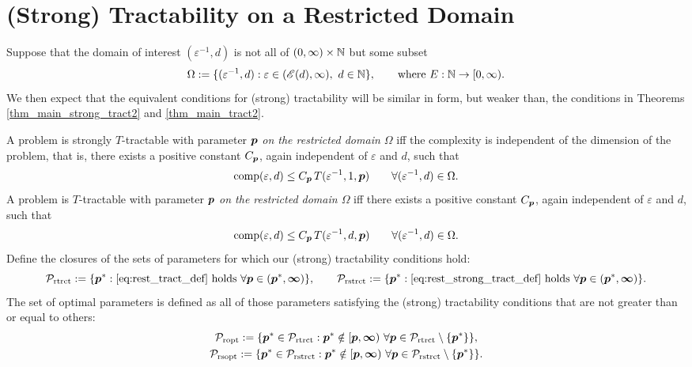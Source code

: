 \documentclass[sort&compress]{elsarticle}
\newcommand{\theM}{\mathscr{E}}
\newcommand{\peter}[1]{\begingroup\color{purple}#1\endgroup}
\begin{document}
\section{(Strong) Tractability on a Restricted Domain}

Suppose that the domain of interest $(\varepsilon^{-1},d)$ is not all of $(0,\infty) \times \mathbb{N}$ but some subset
\begin{equation}
    \Omega  := \{(\varepsilon^{-1},d) : \varepsilon \in (\theM(d),\infty), \ d \in \naturals \}, \qquad \text{where }E : \naturals \to [0,\infty).
\end{equation}
We then expect that the equivalent conditions for (strong) tractability will be similar in form, but weaker than, the conditions in Theorems  \ref{thm_main_strong_tract2} and \ref{thm_main_tract2}.

\begin{definition}
    A problem is strongly
$T$-tractable with parameter $\boldsymbol{p}$ \emph{on the restricted domain $\Omega$} iff the complexity is independent of the dimension of the problem, that is, there exists a positive constant $C_{\boldsymbol{p}}$, again independent of $\varepsilon$ and $d$, such that
\begin{equation} \label{eq:rest_strong_tract_def}
	\operatorname{comp}(\varepsilon,d) \le C_{\boldsymbol{p}}\, T(\varepsilon^{-1},1,\boldsymbol{p}) \qquad \forall(\varepsilon^{-1},d) \in \Omega.
\end{equation}
A problem is 
$T$-tractable with parameter $\boldsymbol{p}$ \emph{on the restricted domain $\Omega$} iff there exists a positive constant $C_{\boldsymbol{p}}$, again independent of $\varepsilon$ and $d$, such that
\begin{equation} \label{eq:rest_tract_def}
	\operatorname{comp}(\varepsilon,d) \le C_{\boldsymbol{p}}\, T(\varepsilon^{-1},d,\boldsymbol{p}) \qquad \forall(\varepsilon^{-1},d) \in \Omega.
\end{equation}
 Define the closures of the sets of parameters for which our (strong) tractability conditions hold:
\begin{equation*}
	\mathcal{P}_{\textup{rtrct}} : = \{\boldsymbol{p}^* : \eqref{eq:rest_tract_def} \text{ holds }\forall \boldsymbol{p} \in (\boldsymbol{p}^*,\boldsymbol{\infty})\}, \qquad
	\mathcal{P}_{\textup{rstrct}} : = \{\boldsymbol{p}^* : \eqref{eq:rest_strong_tract_def} \text{ holds }\forall \boldsymbol{p} \in (\boldsymbol{p}^*,\boldsymbol{\infty})\}.
\end{equation*}
    The  set of optimal parameters is defined as all of those parameters satisfying the (strong) tractability conditions that are not greater than or equal to others:
\begin{gather}
	\mathcal{P}_{\textup{ropt}} : = \{\boldsymbol{p}^* \in \mathcal{P}_{\textup{rtrct}} :  \boldsymbol{p}^* \notin [\boldsymbol{p},\boldsymbol{\infty}) \ \forall \boldsymbol{p} \in  \mathcal{P}_{\textup{rtrct}} \setminus \{\boldsymbol{p}^*\} \}, \\
	\mathcal{P}_{\textup{rsopt}} : = \{\boldsymbol{p}^* \in \mathcal{P}_{\textup{rstrct}} :  \boldsymbol{p}^* \notin [\boldsymbol{p},\boldsymbol{\infty}) \ \forall \boldsymbol{p} \in  \mathcal{P}_{\textup{rstrct}} \setminus \{\boldsymbol{p}^*\} \}.
\end{gather}
\end{definition}
\end{document}
